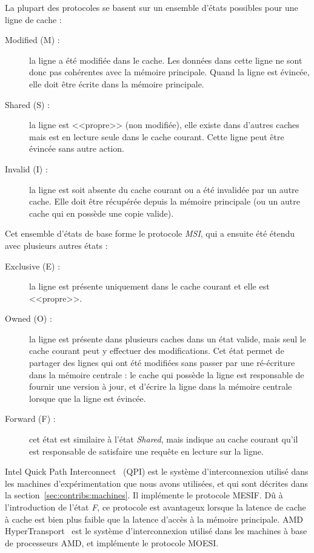 La plupart des protocoles se basent sur un ensemble d'états possibles pour une ligne de cache :

\begin{description}
  \item [Modified (M) :] la ligne a été modifiée dans le cache. Les données dans cette ligne ne sont donc pas cohérentes avec la mémoire principale. Quand la ligne est évincée, elle doit être écrite dans la mémoire principale.
  \item [Shared (S) :] la ligne est <<propre>> (non modifiée), elle existe dans d'autres caches mais est en lecture seule dans le cache courant. Cette ligne peut être évincée sans autre action.
  \item [Invalid (I) :] la ligne est soit absente du cache courant ou a été invalidée par un autre cache. Elle doit être récupérée depuis la mémoire principale (ou un autre cache qui en possède une copie valide).
\end{description}

Cet ensemble d'états de base forme le protocole \emph{MSI}, qui a ensuite été étendu avec plusieurs autres états :

\begin{description}
  \item [Exclusive (E) :] la ligne est présente uniquement dans le cache courant et elle est <<propre>>.
  \item [Owned (O) :] la ligne est présente dans plusieurs caches dans un état valide, mais seul le cache courant peut y effectuer des modifications.
    Cet état permet de partager des lignes qui ont été modifiées sans passer par une ré-écriture dans la mémoire centrale : le cache qui possède la ligne est responsable de fournir une version à jour, et d'écrire la ligne dans la mémoire centrale lorsque que la ligne est évincée.
  \item [Forward (F) :] cet état est similaire à l'état \emph{Shared}, mais indique au cache courant qu'il est responsable de satisfaire une requête en lecture sur la ligne.
\end{description}

Intel Quick Path Interconnect~\cite{Ziakas2010} (QPI) est le système d'interconnexion utilisé dans les machines d'expérimentation que nous avons utilisées, et qui sont décrites dans la section~\ref{sec:contribs:machines}.
Il implémente le protocole MESIF. Dû à l'introduction de l'état \emph{F}, ce protocole est avantageux lorsque la latence de cache à cache est bien plus faible que la latence d'accès à la mémoire principale.
AMD HyperTransport~\cite{Keltcher2003} est le système d'interconnexion utilisé dans les machines à base de processeurs AMD, et implémente le protocole MOESI.

